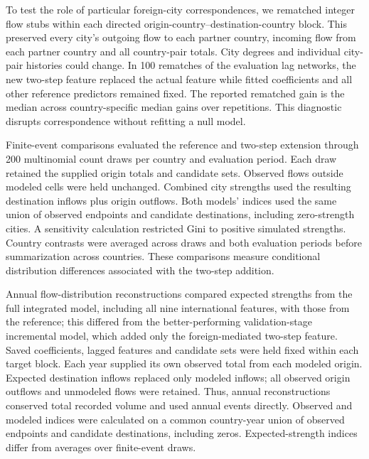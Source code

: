 To test the role of particular foreign-city correspondences, we rematched integer flow stubs within each directed origin-country--destination-country block. This preserved every city's outgoing flow to each partner country, incoming flow from each partner country and all country-pair totals. City degrees and individual city-pair histories could change. In 100 rematches of the evaluation lag networks, the new two-step feature replaced the actual feature while fitted coefficients and all other reference predictors remained fixed. The reported rematched gain is the median across country-specific median gains over repetitions. This diagnostic disrupts correspondence without refitting a null model.

Finite-event comparisons evaluated the reference and two-step extension through 200 multinomial count draws per country and evaluation period. Each draw retained the supplied origin totals and candidate sets. Observed flows outside modeled cells were held unchanged. Combined city strengths used the resulting destination inflows plus origin outflows. Both models' indices used the same union of observed endpoints and candidate destinations, including zero-strength cities. A sensitivity calculation restricted Gini to positive simulated strengths. Country contrasts were averaged across draws and both evaluation periods before summarization across countries. These comparisons measure conditional distribution differences associated with the two-step addition.

Annual flow-distribution reconstructions compared expected strengths from the full integrated model, including all nine international features, with those from the reference; this differed from the better-performing validation-stage incremental model, which added only the foreign-mediated two-step feature. Saved coefficients, lagged features and candidate sets were held fixed within each target block. Each year supplied its own observed total from each modeled origin. Expected destination inflows replaced only modeled inflows; all observed origin outflows and unmodeled flows were retained. Thus, annual reconstructions conserved total recorded volume and used annual events directly. Observed and modeled indices were calculated on a common country-year union of observed endpoints and candidate destinations, including zeros. Expected-strength indices differ from averages over finite-event draws.

